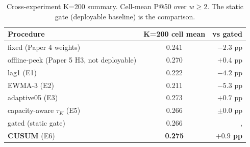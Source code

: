 \begin{table}[!t]
  \caption{Cross-experiment K=200 summary. Cell-mean P@50 over
  $w \geq 2$. The static gate (deployable baseline) is the comparison.}
  \label{tab:summary}
  \centering
  \small
  \setlength{\tabcolsep}{5pt}
  \setlength{\tabcolsep}{4pt}
  \begin{tabular}{@{}p{4.0cm}cr@{}}
    \toprule
    \textbf{Procedure} & \textbf{K=200 cell mean} & \textbf{vs gated} \\
    \midrule
    fixed (Paper 4 weights)          & 0.241 & $-2.3$ pp \\
    offline-peek (Paper 5 H3, not deployable) & 0.270 & $+0.4$ pp \\
    lag1 (E1)                        & 0.222 & $-4.2$ pp \\
    EWMA-3 (E2)                      & 0.211 & $-5.3$ pp \\
    adaptive05 (E3)                  & 0.273 & $+0.7$ pp \\
    capacity-aware $\tau_K$ (E5)     & 0.266 & $\pm 0.0$ pp \\
    gated (static gate)              & 0.266 &, \\
    \textbf{CUSUM} (E6)              & \textbf{0.275} & \textbf{$+0.9$ pp} \\
    \bottomrule
  \end{tabular}
\end{table}
